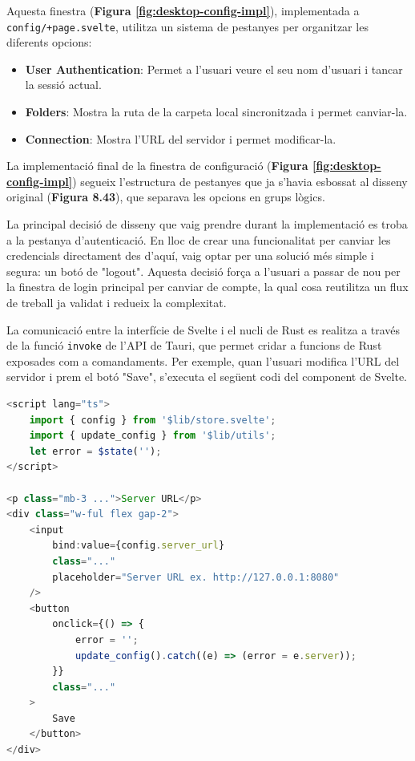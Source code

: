 Aquesta finestra (\textbf{Figura \ref{fig:desktop-config-impl}}), implementada a \texttt{config/+page.svelte}, utilitza un sistema de pestanyes per organitzar les diferents opcions:
\begin{itemize}
    \item \textbf{User Authentication}: Permet a l'usuari veure el seu nom d'usuari i tancar la sessió actual.
    \item \textbf{Folders}: Mostra la ruta de la carpeta local sincronitzada i permet canviar-la.
    \item \textbf{Connection}: Mostra l'URL del servidor i permet modificar-la.
\end{itemize}
La implementació final de la finestra de configuració (\textbf{Figura \ref{fig:desktop-config-impl}}) segueix l'estructura de pestanyes que ja s'havia esbossat al disseny original 
(\textbf{Figura 8.43}), que separava les opcions en grups lògics.

La principal decisió de disseny que vaig prendre durant la implementació es troba a la pestanya d'autenticació. En lloc de crear una funcionalitat per canviar les credencials 
directament des d'aquí, vaig optar per una solució més simple i segura: un botó de "logout". Aquesta decisió força a l'usuari a passar de nou per la finestra de login principal per 
canviar de compte, la qual cosa reutilitza un flux de treball ja validat i redueix la complexitat.

La comunicació entre la interfície de Svelte i el nucli de Rust es realitza a través de la funció \texttt{invoke} de l'API de Tauri, que permet cridar a funcions de Rust exposades com a comandaments. Per exemple, quan l'usuari modifica l'URL del servidor i prem el botó "Save", s'executa el següent codi del component de Svelte.

\begin{lstlisting}[language=javascript, caption={Exemple de crida al backend des de Svelte a \texttt{Connection.svelte}}]
<script lang="ts">
	import { config } from '$lib/store.svelte';
	import { update_config } from '$lib/utils';
	let error = $state('');
</script>

<p class="mb-3 ...">Server URL</p>
<div class="w-ful flex gap-2">
	<input
		bind:value={config.server_url}
		class="..."
		placeholder="Server URL ex. http://127.0.0.1:8080"
	/>
	<button
		onclick={() => {
			error = '';
			update_config().catch((e) => (error = e.server));
		}}
		class="..."
	>
		Save
	</button>
</div>
\end{lstlisting}

